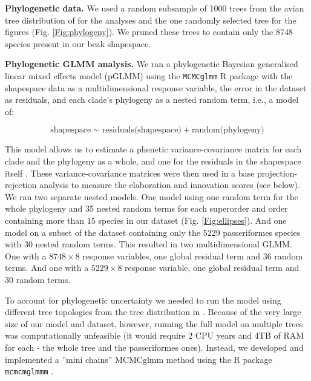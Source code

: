 \documentclass[12pt,letterpaper]{article}
\begin{document}
\textbf{Phylogenetic data.}
We used a random subsample of 1000 trees from the avian tree distribution of \cite{jetz2012global} for the analyses and the one randomly selected tree for the figures (Fig. \ref{Fig:phylogeny}).
We pruned these trees to contain only the 8748 species present in our beak shapespace.




\textbf{Phylogenetic GLMM analysis.}
We ran a phylogenetic Bayesian generalised linear mixed effects model (pGLMM) using the \texttt{MCMCglmm} R package \cite{MCMCglmm} with the shapespace data as a multidimensional response variable, the error in the dataset as residuals, and each clade's phylogeny as a nested random term, i.e., a model of:

\begin{equation}
\text{shapespace} \mathtt{\sim} \text{residuals(shapespace)} + \text{random(phylogeny)}
\end{equation}

This model allows us to estimate a phenetic variance-covariance matrix for each clade and the phylogeny as a whole, and one for the residuals in the shapespace itself \cite{robinson2013quantifying}.
These variance-covariance matrices were then used in a base projection-rejection analysis to measure the elaboration and innovation scores (see below).
We ran two separate nested models.
One model using one random term for the whole phylogeny and 35 nested random terms for each superorder and order containing more than 15 species in our dataset (Fig. \ref{Fig:ellipses}).
And one model on a subset of the dataset containing only the 5229 passeriformes species with 30 nested random terms.
This resulted in two multidimensional GLMM.
One with a $8748 \times 8$ response variables, one global residual term and 36 random terms.
And one with a $5229 \times 8$ response variable, one global residual term and 30 random terms.
 
To account for phylogenetic uncertainty we needed to run the model using different tree topologies from the tree distribution in \cite{jetz2012global}.
Because of the very large size of our model and dataset, however, running the full model on multiple trees was computationally unfeasible (it would require 2 CPU years and 4TB of RAM for each - the whole tree and the passeriformes ones).
Instead, we developed and implemented a ''mini chains'' MCMCglmm method using the R package \texttt{mcmcmglmmm} \cite{mcmcmcglmmm}.
\end{document}
